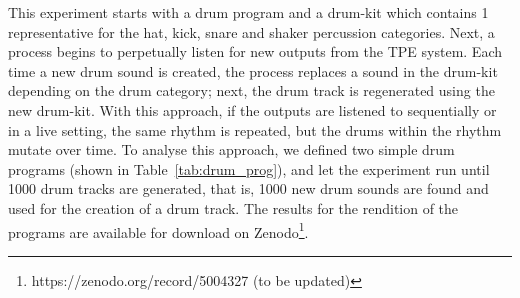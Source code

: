 \documentclass[\main/thesis.tex]{subfiles}
\begin{document}
This experiment starts with a drum program and a drum-kit which contains 1 representative for the hat, kick, snare and shaker percussion categories. Next, a process begins to perpetually listen for new outputs from the TPE system. Each time a new drum sound is created, the process replaces a sound in the drum-kit depending on the drum category; next, the drum track is regenerated using the new drum-kit. With this approach, if the outputs are listened to sequentially or in a live setting, the same rhythm is repeated, but the drums within the rhythm mutate over time. To analyse this approach, we defined two simple drum programs (shown in Table~\ref{tab:drum_prog}), and let the experiment run until 1000 drum tracks are generated, that is, 1000 new drum sounds are found and used for the creation of a drum track. The results for the rendition of the programs are available for download on Zenodo\footnote{https://zenodo.org/record/5004327  (to be updated)}. 
\begin{table}[tbp]
\caption{\label{tab:drum_prog} Parameters for each drum program. A period (\enquote{.}) indicates no action}
\end{table}
\end{document}
